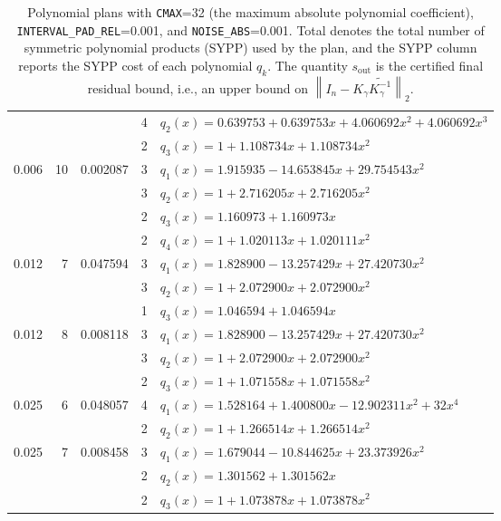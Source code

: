 \documentclass[11pt]{article}
\begin{document}
\begin{table}[htbp]
\begin{tabular}{r r r r l}
          &    &          & 4 & $q_2(x)=0.639753+0.639753x+4.060692x^2+4.060692x^3$ \\
          &    &          & 2 & $q_3(x)=1+1.108734x+1.108734x^2$ \\
    \hline
    0.006 & 10 & 0.002087 & 3 & $q_1(x)=1.915935-14.653845x+29.754543x^2$ \\
          &    &          & 3 & $q_2(x)=1+2.716205x+2.716205x^2$ \\
          &    &          & 2 & $q_3(x)=1.160973+1.160973x$ \\
          &    &          & 2 & $q_4(x)=1+1.020113x+1.020111x^2$ \\
    \hline
    0.012 &  7 & 0.047594 & 3 & $q_1(x)=1.828900-13.257429x+27.420730x^2$ \\
          &    &          & 3 & $q_2(x)=1+2.072900x+2.072900x^2$ \\
          &    &          & 1 & $q_3(x)=1.046594+1.046594x$ \\
    \hline
    0.012 &  8 & 0.008118 & 3 & $q_1(x)=1.828900-13.257429x+27.420730x^2$ \\
          &    &          & 3 & $q_2(x)=1+2.072900x+2.072900x^2$ \\
          &    &          & 2 & $q_3(x)=1+1.071558x+1.071558x^2$ \\
    \hline
    0.025 &  6 & 0.048057 & 4 & $q_1(x)=1.528164+1.400800x-12.902311x^2+32x^4$ \\
          &    &          & 2 & $q_2(x)=1+1.266514x+1.266514x^2$ \\
    \hline
    0.025 &  7 & 0.008458 & 3 & $q_1(x)=1.679044-10.844625x+23.373926x^2$ \\
          &    &          & 2 & $q_2(x)=1.301562+1.301562x$ \\
          &    &          & 2 & $q_3(x)=1+1.073878x+1.073878x^2$ \\
    \hline
  \end{tabular}
  \caption{Polynomial plans with \texttt{CMAX}=32 (the maximum absolute polynomial coefficient), \texttt{INTERVAL\_PAD\_REL}=0.001, and \texttt{NOISE\_ABS}=0.001. Total denotes the total number of symmetric polynomial products (SYPP) used by the plan, and the SYPP column reports the SYPP cost of each polynomial $q_k$. The quantity $s_{\mathrm{out}}$ is the certified final residual bound, i.e., an upper bound on $\left\|{I}_n-{K}_\gamma \widetilde{{K}_\gamma^{-1}}\right\|_2$.}
  \label{tab:poly-hp-plans}
\end{table}
\end{document}
